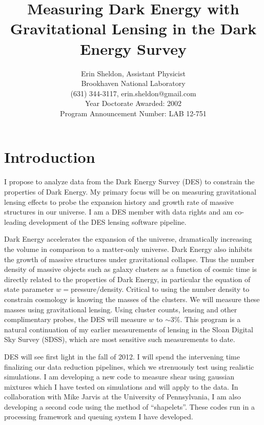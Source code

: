 \documentclass[12pt]{article}
\begin{document}
\title{Measuring Dark Energy with Gravitational Lensing in the Dark Energy Survey}
\author{Erin Sheldon, Assistant Physicist\\
Brookhaven National Laboratory\\
(631) 344-3117, erin.sheldon@gmail.com\\
Year Doctorate Awarded: 2002\\
Program Announcement Number: LAB 12-751}

\date{}
\maketitle

\section{Introduction}
I propose to analyze data from the Dark Energy Survey (DES) to constrain the
properties of Dark Energy.  My primary focus will be on measuring gravitational
lensing effects to probe the expansion history and growth rate of massive
structures in our universe.  I am a DES member with data rights and am co-leading 
development of the DES lensing software pipeline.

Dark Energy accelerates the expansion of the universe, dramatically increasing
the volume in comparison to a matter-only universe.  Dark Energy also inhibits
the growth of massive structures under gravitational collapse.  Thus the number
density of massive objects such as galaxy clusters as a function of cosmic time
is directly related to the properties of Dark Energy, in particular the
equation of state parameter $w=$pressure/density.  Critical to using the number
density to constrain cosmology is knowing the masses of the clusters. We will
measure these masses using gravitational lensing.  Using cluster counts,
lensing and other complimentary probes, the DES will measure $w$ to $\sim$3\%.
This program is a natural continuation of my earlier measurements of lensing in
the Sloan Digital Sky Survey (SDSS), which are most sensitive such measurements
to date.

DES will see first light in the fall of 2012.  I will spend the intervening
time finalizing our data reduction pipelines, which we strenuously test using
realistic simulations.  I am developing a new code to measure shear using
gaussian mixtures which I have tested on simulations and will apply to the
data.  In collaboration with Mike Jarvis at the University of Pennsylvania, I
am also developing a second code using the method of ``shapelets''.  These
codes run in a processing framework and queuing system I have developed. 
\end{document}
